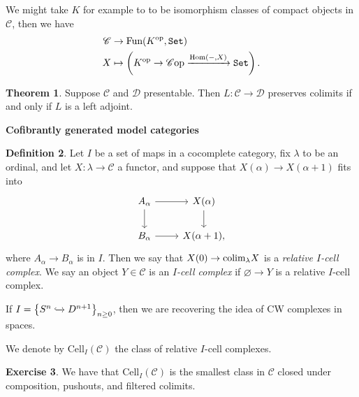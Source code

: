 \documentclass[12pt]{amsart}
\theoremstyle{definition}
\newtheorem{theorem}{Theorem}[section]
\newtheorem{definition}[theorem]{Definition}
\newtheorem{exercise}[theorem]{Exercise}
\let\emptyset\varnothing
\providecommand{\Cell}{\text{Cell}}
\begin{document}
We might take $K$ for example to to be isomorphism classes of compact objects in $\mathscr{C}$, then we have
\begin{align*}
    \mathscr{C} &\to \text{Fun}(K^{\text{op}},\texttt{Set}) \\
    X &\mapsto \left( K^{\text{op}} \to \mathscr{C}\text{op} \xrightarrow{\text{Hom}(-,X)} \texttt{Set} \right).
\end{align*}
\begin{theorem} Suppose $\mathscr{C}$ and $\mathscr{D}$ presentable. Then $L : \mathscr{C} \to \mathscr{D}$ preserves colimits if and only if $L$ is a left adjoint.
\end{theorem}

\begin{center}
    \textbf{Cofibrantly generated model categories}
\end{center}

\begin{definition} Let $I$ be a set of maps in a cocomplete category, fix $\lambda$ to be an ordinal, and let $X: \lambda \to \mathscr{C}$ a functor, and suppose that $X(\alpha) \to X(\alpha+1)$ fits into
\[ \begin{tikzcd}
    A_\alpha\dar\rar & X(\alpha)\dar\\
    B_\alpha\rar & X(\alpha+1),
\end{tikzcd} \]
where $A_\alpha \to B_\alpha$ is in $I$. Then we say that $X(0) \to \text{colim}_\lambda X$ is a \textit{relative $I$-cell complex}. We say an object $Y\in \mathscr{C}$ is an \textit{$I$-cell complex} if $\emptyset \to Y$ is a relative $I$-cell complex.
\end{definition}

If $I = \left\{ S^n \xhookrightarrow{} D^{n+1} \right\}_{n\ge 0}$, then we are recovering the idea of CW complexes in spaces.

We denote by $\Cell_I(\mathscr{C})$ the class of relative $I$-cell complexes.

\begin{exercise} We have that $\Cell_I(\mathscr{C})$ is the smallest class in $\mathscr{C}$ closed under composition, pushouts, and filtered colimits.
\end{exercise}
\end{document}
